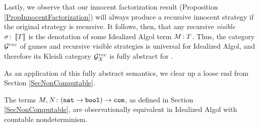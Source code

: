 Lastly, we observe that our innocent factorization result (Proposition \ref{PropInnocentFactorization}) will always produce a recursive innocent strategy if the original strategy is recursive.  
It follows, then, that any recursive \emph{visible} $\sigma\colon \left\llbracket T\right\rrbracket$ is the denotation of some Idealized Algol term $M \colon T$.
Thus, the category $\mathcal G^{rec}$ of games and recursive visible strategies is universal for Idealized Algol, and therefore its Kleisli category $\mathcal G^{rec}_X$ is fully abstract for \IAX.

As an application of this fully abstract semantics, we clear up a loose end from Section \ref{SecNonComputable}.

\begin{lemma}
  The terms $M,N\colon ({\mathtt{nat}} \to {\mathtt{bool}}) \to {\mathtt{com}}$, as defined in Section \ref{SecNonComputable}, are observationally equivalent in Idealized Algol with countable nondeterminism.
\end{lemma}
